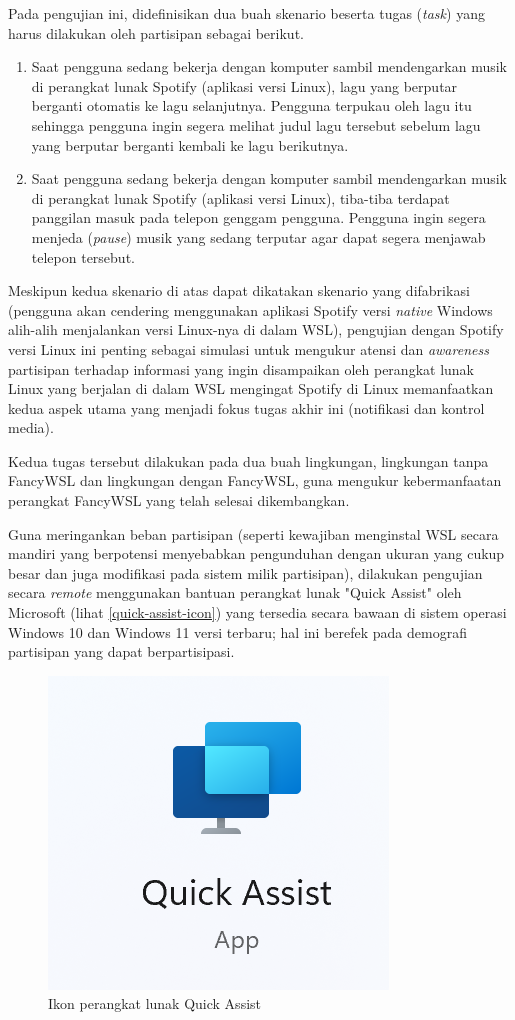 Pada pengujian ini, didefinisikan dua buah skenario beserta tugas (\textit{task}) yang harus dilakukan oleh partisipan sebagai berikut.
\begin{enumerate}
    \item Saat pengguna sedang bekerja dengan komputer sambil mendengarkan musik di perangkat lunak Spotify (aplikasi versi Linux), lagu yang berputar berganti otomatis ke lagu selanjutnya. Pengguna terpukau oleh lagu itu sehingga pengguna ingin segera melihat judul lagu tersebut sebelum lagu yang berputar berganti kembali ke lagu berikutnya.
    \item Saat pengguna sedang bekerja dengan komputer sambil mendengarkan musik di perangkat lunak Spotify (aplikasi versi Linux), tiba-tiba terdapat panggilan masuk pada telepon genggam pengguna. Pengguna ingin segera menjeda (\textit{pause}) musik yang sedang terputar agar dapat segera menjawab telepon tersebut.
\end{enumerate}

Meskipun kedua skenario di atas dapat dikatakan skenario yang difabrikasi (pengguna akan cendering menggunakan aplikasi Spotify versi \textit{native} Windows alih-alih menjalankan versi Linux-nya di dalam WSL), pengujian dengan Spotify versi Linux ini penting sebagai simulasi untuk mengukur atensi dan \textit{awareness} partisipan terhadap informasi yang ingin disampaikan oleh perangkat lunak Linux yang berjalan di dalam WSL mengingat Spotify di Linux memanfaatkan kedua aspek utama yang menjadi fokus tugas akhir ini (notifikasi dan kontrol media).

Kedua tugas tersebut dilakukan pada dua buah lingkungan, lingkungan tanpa FancyWSL dan lingkungan dengan FancyWSL, guna mengukur kebermanfaatan perangkat FancyWSL yang telah selesai dikembangkan.

Guna meringankan beban partisipan (seperti kewajiban menginstal WSL secara mandiri yang berpotensi menyebabkan pengunduhan dengan ukuran yang cukup besar dan juga modifikasi pada sistem milik partisipan), dilakukan pengujian secara \textit{remote} menggunakan bantuan perangkat lunak "Quick Assist" oleh Microsoft (lihat \autoref{quick-assist-icon}) yang tersedia secara bawaan di sistem operasi Windows 10 dan Windows 11 versi terbaru; hal ini berefek pada demografi partisipan yang dapat berpartisipasi.

\begin{figure}
    \centering
    \includegraphics[width=0.25\linewidth]{assets/Screenshot 2024-01-18 194804.png}
    \caption{Ikon perangkat lunak Quick Assist}
    \label{quick-assist-icon}
\end{figure}

